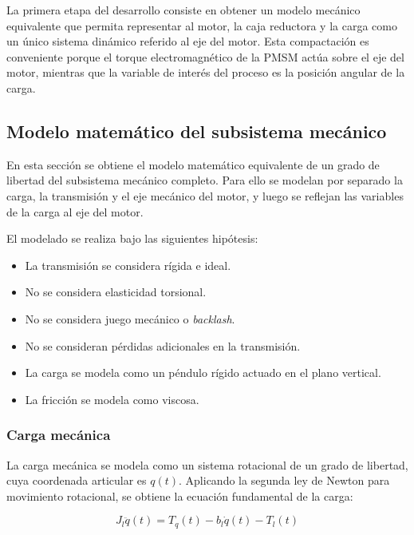 \documentclass[10pt,a4paper]{article}
\begin{document}
La primera etapa del desarrollo consiste en obtener un modelo mecánico equivalente que permita representar al motor, la caja reductora y la carga como un único sistema dinámico referido al eje del motor. Esta compactación es conveniente porque el torque electromagnético de la PMSM actúa sobre el eje del motor, mientras que la variable de interés del proceso es la posición angular de la carga.

\subsection{Modelo matemático del subsistema mecánico}

En esta sección se obtiene el modelo matemático equivalente de un grado de libertad del subsistema mecánico completo. Para ello se modelan por separado la carga, la transmisión y el eje mecánico del motor, y luego se reflejan las variables de la carga al eje del motor.

El modelado se realiza bajo las siguientes hipótesis:

\begin{itemize}[leftmargin=*]
    \item La transmisión se considera rígida e ideal.
    \item No se considera elasticidad torsional.
    \item No se considera juego mecánico o \textit{backlash}.
    \item No se consideran pérdidas adicionales en la transmisión.
    \item La carga se modela como un péndulo rígido actuado en el plano vertical.
    \item La fricción se modela como viscosa.
\end{itemize}

\subsubsection{Carga mecánica}

La carga mecánica se modela como un sistema rotacional de un grado de libertad, cuya coordenada articular es $q(t)$.
Aplicando la segunda ley de Newton para movimiento rotacional, se obtiene la ecuación fundamental de la carga:

\begin{equation}
    J_l \ddot{q}(t) = T_q(t) - b_l \dot{q}(t) - T_l(t)
    \label{eq:carga_mecanica}
\end{equation}
\end{document}
